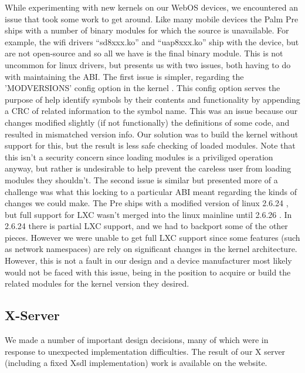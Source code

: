 While experimenting with new kernels on our WebOS devices, we encountered an issue that took some work to get around.  Like many mobile devices the Palm Pre ships with a number of binary modules for which the source is unavailable.  For example, the wifi drivers ``sd8xxx.ko'' and ``uap8xxx.ko'' ship with the device, but are not open-source and so all we have is the final binary module.  This is not uncommon for linux drivers, but presents us with two issues, both having to do with maintaining the ABI.
    The first issue is simpler, regarding the 'MODVERSIONS' config option in the kernel .  This config option serves the purpose of help identify symbols by their contents and functionality by appending a CRC of related information to the symbol name.  This was an issue because our changes modified slightly (if not functionally) the definitions of some code, and resulted in mismatched version info.  Our solution was to build the kernel without support for this, but the result is less safe checking of loaded modules.  Note that this isn't a security concern since loading modules is a priviliged operation anyway, but rather is undesirable to help prevent the careless user from loading modules they shouldn't.
    The second issue is similar but presented more of a challenge was what this locking to a particular ABI meant regarding the kinds of changes we could make.  The Pre ships with a modified version of linux 2.6.24 , but full support for LXC wasn't merged into the linux mainline until 2.6.26 .  In 2.6.24 there is partial LXC support, and we had to backport some of the other pieces.  However we were unable to get full LXC support since some features (such as network namespaces) are rely on significant changes in the kernel architecture.  However, this is not a fault in our design and a device manufacturer most likely would not be faced with this issue, being in the position to acquire or build the related modules for the kernel version they desired.



\subsection{X-Server}

We made a number of important design decisions, many of which were in response to unexpected implementation difficulties.  The result of our X server (including a fixed Xsdl implementation) work is available on the website\footnotemark[1].
